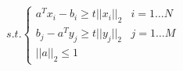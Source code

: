 \message{ !name(ass4_ChangLi.tex)}\documentclass[10pt,a4paper]{article}
\begin{document}

\begin{align*}
  s.t.
  \begin{cases}
    a^Tx_i-b_i\geq t||x_i||_2 & i=1\dots N\\
    b_j-a^Ty_j\geq t||y_j||_2 & j=1\dots M\\
    ||a||_2\leq 1
\end{cases}
\end{align*}




	\renewcommand\refname{Bibliography}
	
	
\end{document}
